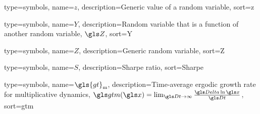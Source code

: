 {
  type={symbols}, 
  name={\ensuremath{z}},
  description={Generic value of a random variable},
  sort=z
}

{
  type={symbols}, 
  name={\ensuremath{Y}},
  description={Random variable that is a function of another random variable, $\Z$},
  sort=Y
}

{
  type={symbols}, 
  name={\ensuremath{Z}},
  description={Generic random variable},
  sort=Z
}


{
  type={symbols}, 
  name={\ensuremath{S}},
  description={Sharpe ratio},
  sort=Sharpe
}

{
  type={symbols}, 
  name={\ensuremath{\gls{gt}_\text{m}}},
  description={Time-average ergodic growth rate for multiplicative dynamics, $\gtm(\x)=\lim_{\Dt\to\infty}\frac{\D \ln \x}{\Dt}$},
  sort=gtm
}
